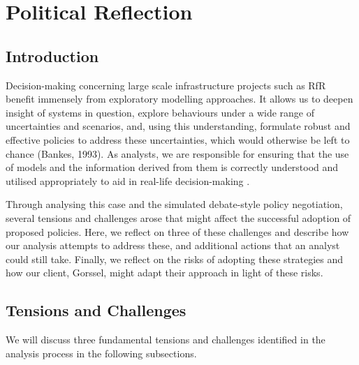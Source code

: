 \section{Political Reflection}
\label{s:poli_reflect}
\subsection{Introduction}

Decision-making concerning large scale infrastructure projects such as RfR benefit immensely from exploratory modelling approaches. It allows us to deepen insight of systems in question, explore behaviours under a wide range of uncertainties and scenarios, and, using this understanding, formulate robust and effective policies to address these uncertainties, which would otherwise be left to chance (Bankes, 1993). As analysts, we are responsible for ensuring that the use of models and the information derived from them is correctly understood and utilised appropriately to aid in real-life decision-making 
\parencite{pielke_honest_2007,van_enst_towards_2014}.

Through analysing this case and the simulated debate-style policy negotiation, several tensions and challenges arose that might affect the successful adoption of proposed policies. Here, we reflect on three of these challenges and describe how our analysis attempts to address these, and additional actions that an analyst could still take. Finally, we reflect on the risks of adopting these strategies and how our client, Gorssel, might adapt their approach in light of these risks.

\subsection{Tensions and Challenges} 

We will discuss three fundamental tensions and challenges identified in the analysis process in the following subsections. 

